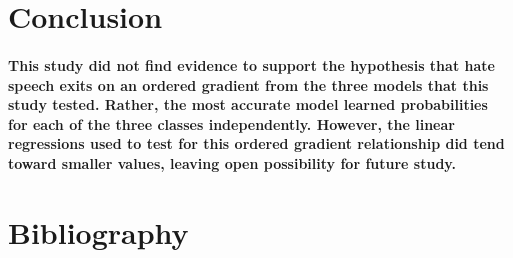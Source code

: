 \documentclass{article}
\begin{document}
\section{Conclusion}
\paragraph{This study did not find evidence to support the hypothesis that hate speech exits on an ordered gradient from the three models that this study tested. Rather, the most accurate model learned probabilities for each of the three classes independently. However, the linear regressions used to test for this ordered gradient relationship did tend toward smaller values, leaving open possibility for future study.}
\section{Bibliography}
\end{document}

